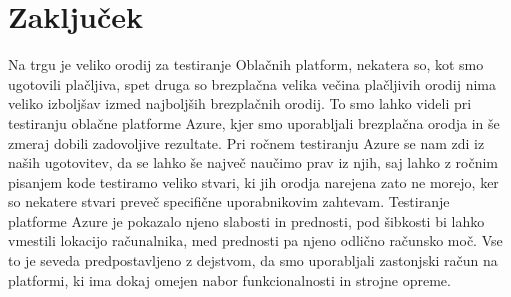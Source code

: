 \section{Zaključek}
Na trgu je veliko orodij za testiranje Oblačnih platform, nekatera so, kot smo ugotovili plačljiva, spet druga so brezplačna velika večina plačljivih orodij nima veliko izboljšav izmed najboljših brezplačnih orodij. To smo lahko videli pri testiranju oblačne platforme Azure, kjer smo uporabljali brezplačna orodja in še zmeraj dobili zadovoljive rezultate. Pri ročnem testiranju Azure se nam zdi iz naših ugotovitev, da se lahko še največ naučimo prav iz njih, saj lahko z ročnim pisanjem kode testiramo veliko stvari, ki jih orodja narejena zato ne morejo, ker so nekatere stvari preveč specifične uporabnikovim zahtevam. Testiranje platforme Azure je pokazalo njeno slabosti in prednosti, pod šibkosti bi lahko vmestili lokacijo računalnika, med prednosti pa njeno odlično računsko moč. Vse to je seveda predpostavljeno z dejstvom, da smo uporabljali zastonjski račun na platformi, ki ima dokaj omejen nabor funkcionalnosti in strojne opreme.

